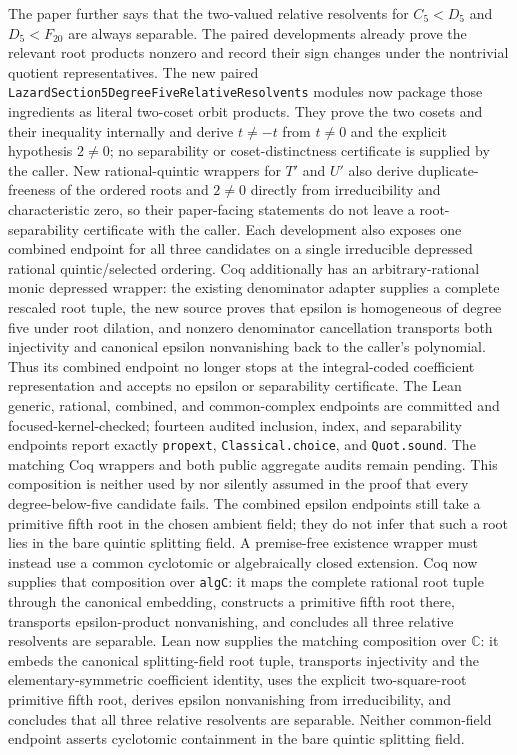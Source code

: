 \documentclass[11pt,a4paper,oneside]{article}
\newcommand{\lean}[1]{\nolinkurl{#1}}
\begin{document}
The paper further says that the two-valued relative resolvents for
$C_5<D_5$ and $D_5<F_{20}$ are always separable.  The paired developments
already prove the relevant root products nonzero and record their sign changes
under the nontrivial quotient representatives.  The new paired
\texttt{LazardSection5DegreeFiveRelativeResolvents} modules now package those
ingredients as literal two-coset orbit products.  They prove the two cosets
and their inequality internally and derive $t\ne-t$ from $t\ne0$ and the
explicit hypothesis $2\ne0$; no separability or coset-distinctness certificate
is supplied by the caller.  New rational-quintic wrappers for $T'$ and $U'$
also derive duplicate-freeness of the ordered roots and $2\ne0$ directly from
irreducibility and characteristic zero, so their paper-facing statements do
not leave a root-separability certificate with the caller.  Each development
also exposes one combined endpoint for all three candidates on a single
irreducible depressed rational quintic/selected ordering.  Coq additionally
has an arbitrary-rational monic depressed wrapper: the existing denominator
adapter supplies a complete rescaled root tuple, the new source proves that
epsilon is homogeneous of degree five under root dilation, and nonzero
denominator cancellation transports both injectivity and canonical epsilon
nonvanishing back to the caller's polynomial.  Thus its combined endpoint no
longer stops at the integral-coded coefficient representation and accepts no
epsilon or separability certificate.  The Lean generic, rational, combined,
and common-complex endpoints are committed and focused-kernel-checked;
fourteen audited inclusion, index, and separability endpoints report exactly
\lean{propext}, \lean{Classical.choice}, and \lean{Quot.sound}.  The matching
Coq wrappers and both public aggregate audits remain pending.  This
composition is neither
used by nor silently assumed in the proof that every degree-below-five
candidate fails.  The combined epsilon endpoints still take a primitive
fifth root in the chosen ambient field; they do not infer that such a root
lies in the bare quintic splitting field.  A premise-free existence wrapper
must instead use a common cyclotomic or algebraically closed extension.  Coq
now supplies that composition over \texttt{algC}: it maps the complete
rational root tuple through the canonical embedding, constructs a primitive
fifth root there, transports epsilon-product nonvanishing, and concludes all
three relative resolvents are separable.  Lean now supplies the matching
composition over $\mathbb C$: it embeds the canonical splitting-field root
tuple, transports injectivity and the elementary-symmetric coefficient
identity, uses the explicit two-square-root primitive fifth root, derives
epsilon nonvanishing from irreducibility, and concludes that all three
relative resolvents are separable.  Neither common-field endpoint asserts
cyclotomic containment in the bare quintic splitting field.
\end{document}
